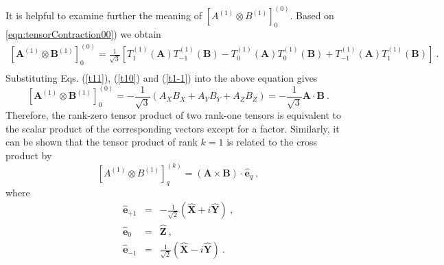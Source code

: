 It is helpful to examine further the meaning of $\left[  A^{(1)} \otimes B^{(1)} \right]^{(0)}_{0}$. 
Based on \autoref{eqn:tensorContraction00}) we obtain
\begin{eqnarray}
\left[ \mathbf{A}^{(1)}\otimes \mathbf{B}^{(1)} \right]_{0}^{(0)} =\frac{1}{\sqrt{3}}\left[T^{(1)}_{1}(\mathbf{A}) T^{(1)}_{-1}(\mathbf{B}) -T^{(1)}_{0}(\mathbf{A}) T^{(1)}_{0}(\mathbf{B}) +  T^{(1)}_{-1} (\mathbf{A}) T^{(1)}_{1}(\mathbf{B})\right] \ . \nonumber \\
\end{eqnarray}
Substituting Eqs. (\ref{t11}), (\ref{t10}) and (\ref{t1-1}) into the above equation gives
\begin{equation}
\left[ \mathbf{A}^{(1)}\otimes \mathbf{B}^{(1)} \right]_{0}^{(0)}  = -\frac{1}{\sqrt{3}} (A_{X}B_{X}+ A_{Y}B_{Y} + A_{Z}B_{Z}) = -\frac{1}{\sqrt{3}} \mathbf{A}\cdot\mathbf{B} \ . \label{eqn:tensorDotProduct}
\end{equation}
Therefore, the rank-zero tensor product of two rank-one tensors is equivalent to the scalar product of the corresponding
 vectors except for a factor.  
Similarly, it can be shown that the tensor product of rank $k=1$ is related to the cross product by 
\begin{equation}
\left[ A^{(1)} \otimes B^{(1)} \right]_{q}^{(k)} = (\mathbf{A}\times \mathbf{B})\cdot \mathbf{\hat{e}}_{q} \ ,
\label{eqn:crossProduct}
\end{equation}
where
\begin{eqnarray}
\mathbf{\hat{e}}_{+1} &=& -\frac{1}{\sqrt{2}}(\mathbf{\hat{X}} + i \mathbf{\hat{Y}}) \ , \nonumber \\
\mathbf{\hat{e}}_{0} &=& \mathbf{\hat{Z}} \ , \nonumber \\
\mathbf{\hat{e}}_{-1} &=& \frac{1}{\sqrt{2}}(\mathbf{\hat{X}} - i \mathbf{\hat{Y}}) \ .
\end{eqnarray}

